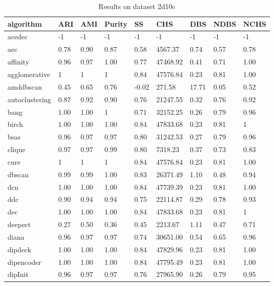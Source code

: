 \begin{table}[H]
\centering
\caption{Results on dataset 2d10c}
\label{tab:params:2d10c}
\begin{tabular}{|l|l|l|l|l|l|l|l|l|}
\hline
algorithm & ARI & AMI & Purity & SS & CHS & DBS & NDBS & NCHS \\
\hline
acedec & -1 & -1 & -1 & -1 & -1 & -1 & -1 & -1 \\
\hline
aec & 0.78 & 0.90 & 0.87 & 0.58 & 4567.37 & 0.74 & 0.57 & 0.78 \\
\hline
affinity & 0.96 & 0.97 & 1.00 & 0.77 & 47468.92 & 0.41 & 0.71 & 1.00 \\
\hline
agglomerative & 1 & 1 & 1 & 0.84 & 47576.84 & 0.23 & 0.81 & 1.00 \\
\hline
amddbscan & 0.45 & 0.65 & 0.76 & -0.02 & 271.58 & 17.71 & 0.05 & 0.52 \\
\hline
autoclustering & 0.87 & 0.92 & 0.90 & 0.76 & 21247.55 & 0.32 & 0.76 & 0.92 \\
\hline
bang & 1.00 & 1.00 & 1 & 0.71 & 32152.25 & 0.26 & 0.79 & 0.96 \\
\hline
birch & 1.00 & 1.00 & 1.00 & 0.84 & 47833.68 & 0.23 & 0.81 & 1 \\
\hline
bsas & 0.96 & 0.97 & 0.97 & 0.80 & 31242.53 & 0.27 & 0.79 & 0.96 \\
\hline
clique & 0.97 & 0.97 & 0.99 & 0.80 & 7318.23 & 0.37 & 0.73 & 0.83 \\
\hline
cure & 1 & 1 & 1 & 0.84 & 47576.84 & 0.23 & 0.81 & 1.00 \\
\hline
dbscan & 0.99 & 0.99 & 1.00 & 0.83 & 26371.49 & 1.10 & 0.48 & 0.94 \\
\hline
dcn & 1.00 & 1.00 & 1.00 & 0.84 & 47739.39 & 0.23 & 0.81 & 1.00 \\
\hline
ddc & 0.90 & 0.94 & 0.94 & 0.75 & 22114.87 & 0.29 & 0.78 & 0.93 \\
\hline
dec & 1.00 & 1.00 & 1.00 & 0.84 & 47833.68 & 0.23 & 0.81 & 1 \\
\hline
deepect & 0.27 & 0.50 & 0.36 & 0.45 & 2213.67 & 1.11 & 0.47 & 0.71 \\
\hline
diana & 0.96 & 0.97 & 0.97 & 0.74 & 30651.00 & 0.54 & 0.65 & 0.96 \\
\hline
dipdeck & 1.00 & 1.00 & 1.00 & 0.84 & 47829.96 & 0.23 & 0.81 & 1.00 \\
\hline
dipencoder & 1.00 & 1.00 & 1.00 & 0.84 & 47795.49 & 0.23 & 0.81 & 1.00 \\
\hline
dipInit & 0.96 & 0.97 & 0.97 & 0.76 & 27965.90 & 0.26 & 0.79 & 0.95 \\

\end{tabular}
\end{table}
